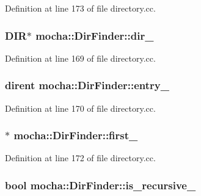 Definition at line 173 of file directory.cc.

\hypertarget{classmocha_1_1_dir_finder_a28e4e804d01d3b22fdcd3c24de664a80}{
\subsubsection[{dir\_\-}]{\setlength{\rightskip}{0pt plus 5cm}DIR$\ast$ {\bf mocha::DirFinder::dir\_\-}}}
\label{classmocha_1_1_dir_finder_a28e4e804d01d3b22fdcd3c24de664a80}


Definition at line 169 of file directory.cc.

\hypertarget{classmocha_1_1_dir_finder_aad8c41bba9d05cb0b0c4d96cee2e0d14}{
\subsubsection[{entry\_\-}]{\setlength{\rightskip}{0pt plus 5cm}dirent {\bf mocha::DirFinder::entry\_\-}}}
\label{classmocha_1_1_dir_finder_aad8c41bba9d05cb0b0c4d96cee2e0d14}


Definition at line 170 of file directory.cc.

\hypertarget{classmocha_1_1_dir_finder_a65235eb369e6a960d885fce284d25400}{
\subsubsection[{first\_\-}]{$\ast$ {\bf mocha::DirFinder::first\_\-}}}
\label{classmocha_1_1_dir_finder_a65235eb369e6a960d885fce284d25400}


Definition at line 172 of file directory.cc.

\hypertarget{classmocha_1_1_dir_finder_a2b47a8b8bd03f5af49a5dd5058d13b3a}{
\subsubsection[{is\_\-recursive\_\-}]{\setlength{\rightskip}{0pt plus 5cm}bool {\bf mocha::DirFinder::is\_\-recursive\_\-}}}
\label{classmocha_1_1_dir_finder_a2b47a8b8bd03f5af49a5dd5058d13b3a}


